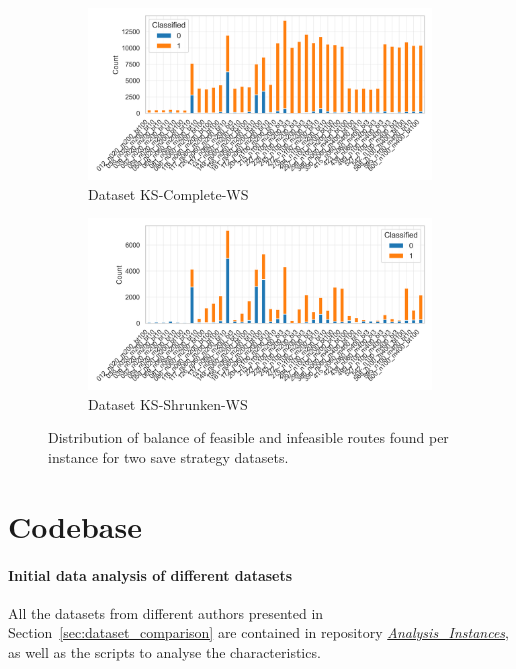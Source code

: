 \begin{figure}[!ht]
	\centering
	\begin{subfigure}[t]{.5\textwidth}
		\centering
		\includegraphics[width=\linewidth]{pictures/dataset_structure/distribution_plot_krebs_28880_600_WS.png}
		\caption{Dataset KS-Complete-WS}
		\label{fig:ds-a-krebs_x}
	\end{subfigure}%
	\begin{subfigure}[t]{.5\textwidth}
		\centering
		\includegraphics[width=\linewidth]{pictures/dataset_structure/distribution_plot_krebs_28880_600_WS_Shrinked094.png}
		\caption{Dataset KS-Shrunken-WS}
		\label{fig:ds-b-krebs_l}
	\end{subfigure}
	\caption{Distribution of balance of feasible and infeasible routes found per \krebsADataSetText instance for two save strategy datasets.}
	\label{fig:route-feasibility_save_krebs}
\end{figure}

\clearpage
\chapter{Codebase}
\label{app:sec:github_implementations}

\subsubsection{Initial data analysis of different datasets}
All the datasets from different authors presented in Section~\ref{sec:dataset_comparison} are contained in repository
\href{https://github.com/MxHbm/Analysis_Instances}{\textit{Analysis\_Instances}}, as well as the scripts to analyse the characteristics.


